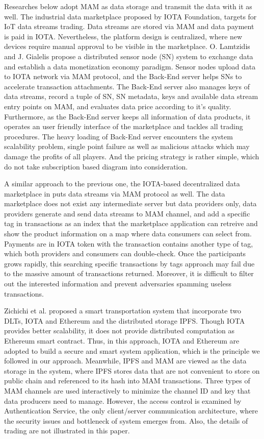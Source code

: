 Researches below adopt MAM as data storage and transmit the data with it as well. The industrial data marketplace\cite{IOTAIdustryMarketplace} proposed by IOTA Foundation, targets for IoT data streams trading. Data streams are stored via MAM and data payment is paid in IOTA. Nevertheless, the platform design is centralized, where new devices require manual approval to be visible in the marketplace. O. Lamtzidis and J. Gialelis \cite{IOTASensorNode} propose a distributed sensor node (SN) system to exchange data and establish a data monetization economy paradigm. Sensor nodes upload data to IOTA network via MAM protocol, and the Back-End server helps SNs to accelerate transaction attachments. The Back-End server also manages keys of data streams, record a tuple of SN, SN metadata, keys and available data stream entry points on MAM, and evaluates data price according to it's quality. Furthermore, as the Back-End server keeps all information of data products, it operates an user friendly interface of the marketplace and tackles all trading procedures. The heavy loading of Back-End server encounters the system scalability problem, single point failure as well as malicious attacks which may damage the profits of all players. And the pricing strategy is rather simple, which do not take subscription based diagram into consideration.

A similar approach to the previous one, the IOTA-based decentralized data marketplace in \cite{DDMSmartCities} puts data streams via MAM protocol as well. The data marketplace does not exist any intermediate server but data providers only, data providers generate and send data streams to MAM channel, and add a specific tag in transactions as an index that the marketplace application can retreive and show the product information on a map where data consumers can select from. Payments are in IOTA token with the transaction contains another type of tag, which both providers and consumers can double-check. Once the participants grows rapidly, this searching specific transactions by tags approach may fail due to the massive amount of transactions returned. Moreover, it is difficult to filter out the interested information and prevent adversaries spamming useless transactions.  

Zichichi et al.\cite{SocialGood} proposed a smart transportation system that incorporate two DLTs, IOTA and Ethereum and the distributed storage IPFS. Though IOTA provides better scalability, it does not provide distributed computation as Ethereum smart contract. Thus, in this approach, IOTA and Ethereum are adopted to build a secure and smart system application, which is the principle we followed in our approach. Meanwhile, IPFS and MAM are viewed as the data storage in the system, where IPFS stores data that are not convenient to store on public chain and referenced to its hash into MAM transactions. Three types of MAM channels are used interactively to minimize the channel ID and key that data producers need to manage. However, the access control is examined by Authentication Service, the only client/server communication architecture, where the security issues and bottleneck of system emerges from. Also, the details of trading are not illustrated in this paper.

